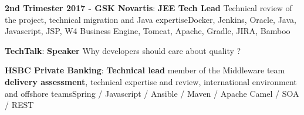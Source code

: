 \begin{cventries}
{\begin{cvitems}
            \item { \textbf{2nd Trimester 2017 - GSK Novartis}: \textbf{JEE Tech Lead} \newline Technical review of the project, technical migration and Java expertise\newline Docker, Jenkins, Oracle, Java, Javascript, JSP, W4 Business Engine, Tomcat, Apache, Gradle, JIRA, Bamboo}	
            \item { \textbf{TechTalk}: \textbf{Speaker} \newline Why developers should care about quality ?}		
            \item { \textbf{HSBC Private Banking}: \textbf{Technical lead} \newline member of the Middleware team  \textbf{delivery assessment}, technical expertise and review, international environment and offshore teams\newline Spring / Javascript / Ansible / Maven / Apache Camel / SOA / REST}		
        \end{cvitems}
    }
    

\end{cventries}

